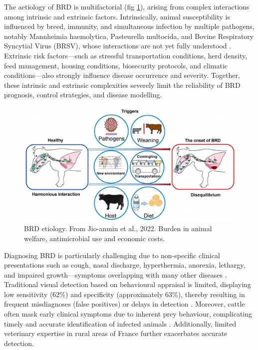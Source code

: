 The aetiology of BRD is multifactorial (fig \ref{fig:chap1-BRDetiology}), arising from complex interactions among intrinsic and extrinsic factors. Intrinsically, animal susceptibility is influenced by breed, immunity, and simultaneous infection by multiple pathogens, notably Mannheimia haemolytica, Pasteurella multocida, and Bovine Respiratory Syncytial Virus (BRSV), whose interactions are not yet fully understood 
\cite{https://doi.org/10.1111/j.1751-0813.2003.tb13367.x, Duff2007}. Extrinsic risk factors—such as stressful transportation conditions, herd density, feed management, housing conditions, biosecurity protocols, and climatic conditions—also strongly influence disease occurrence and severity. Together, these intrinsic and extrinsic complexities severely limit the reliability of BRD prognosis, control strategies, and disease modelling.


\begin{figure}[h]
  \includegraphics[width=\linewidth]{figures/chap1/BRD etiology.png}
  \caption{BRD etiology. From Jio-anmin et al., 2022. Burden in animal welfare, antimicrobial use and economic costs.}
  \label{fig:chap1-BRDetiology}
\end{figure}

Diagnosing BRD is particularly challenging due to non-specific clinical presentations such as cough, nasal discharge, hyperthermia, anorexia, lethargy, and impaired growth—symptoms overlapping with many other diseases \cite{https://doi.org/10.1111/j.1751-0813.2003.tb13367.x, GRIFFIN201057}. Traditional visual detection based on behavioural appraisal is limited, displaying low sensitivity (62\%) and specificity (approximately 63\%), thereby resulting in frequent misdiagnoses (false positives) or delays in detection \cite{doi:10.1177/104063870902100405, Duff2009}. Moreover, cattle often mask early clinical symptoms due to inherent prey behaviour, complicating timely and accurate identification of infected animals \cite{GRIFFIN201057}. Additionally, limited veterinary expertise in rural areas of France further exacerbates accurate detection.

